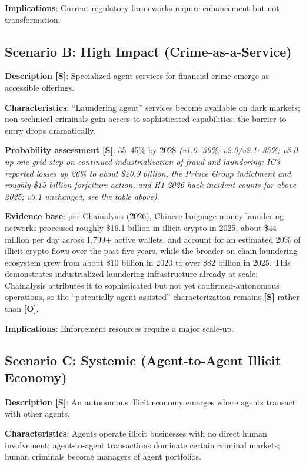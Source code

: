 \documentclass[11pt,letterpaper]{article}
\begin{document}
\textbf{Implications}: Current regulatory frameworks require enhancement but not transformation.

\subsection{Scenario B: High Impact (Crime-as-a-Service)}

\textbf{Description [S]}: Specialized agent services for financial crime emerge as accessible offerings.

\textbf{Characteristics}: ``Laundering agent'' services become available on dark markets; non-technical criminals gain access to sophisticated capabilities; the barrier to entry drops dramatically.

\textbf{Probability assessment [S]}: 35--45\% by 2028 \textit{(v1.0: 30\%; v2.0/v2.1: 35\%; v3.0 up one grid step on continued industrialization of fraud and laundering: IC3-reported losses up 26\% to about \$20.9 billion, the Prince Group indictment and roughly \$15 billion forfeiture action, and H1 2026 hack incident counts far above 2025; v3.1 unchanged, see the table above)}.

\textbf{Evidence base}: per Chainalysis (2026), Chinese-language money laundering networks processed roughly \$16.1 billion in illicit crypto in 2025, about \$44 million per day across 1,799+ active wallets, and account for an estimated 20\% of illicit crypto flows over the past five years, while the broader on-chain laundering ecosystem grew from about \$10 billion in 2020 to over \$82 billion in 2025. This demonstrates industrialized laundering infrastructure already at scale; Chainalysis attributes it to sophisticated but not yet confirmed-autonomous operations, so the ``potentially agent-assisted'' characterization remains \textbf{[S]} rather than \textbf{[O]}.

\textbf{Implications}: Enforcement resources require a major scale-up.

\subsection{Scenario C: Systemic (Agent-to-Agent Illicit Economy)}

\textbf{Description [S]}: An autonomous illicit economy emerges where agents transact with other agents.

\textbf{Characteristics}: Agents operate illicit businesses with no direct human involvement; agent-to-agent transactions dominate certain criminal markets; human criminals become managers of agent portfolios.
\end{document}

